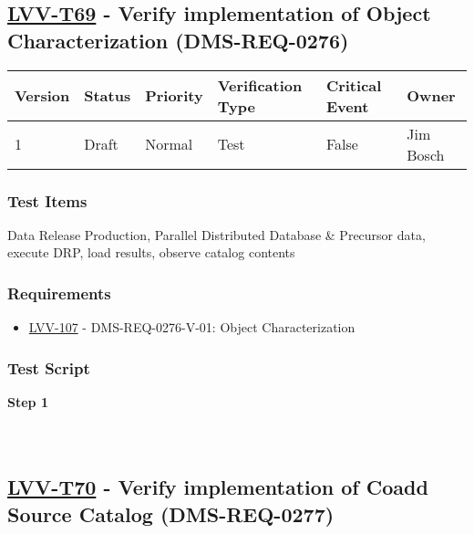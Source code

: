 \hypertarget{lvv-t69---verify-implementation-of-object-characterization-dms-req-0276}{%
\subsection{\texorpdfstring{\href{https://jira.lsstcorp.org/secure/Tests.jspa\#/testCase/LVV-T69}{LVV-T69}
- Verify implementation of Object Characterization
(DMS-REQ-0276)}{LVV-T69 - Verify implementation of Object Characterization (DMS-REQ-0276)}}\label{lvv-t69---verify-implementation-of-object-characterization-dms-req-0276}}

\begin{longtable}[]{@{}llllll@{}}
\toprule
Version & Status & Priority & Verification Type & Critical Event &
Owner\tabularnewline
\midrule
\endhead
1 & Draft & Normal & Test & False & Jim Bosch\tabularnewline
\bottomrule
\end{longtable}

\hypertarget{test-items-45}{%
\subsubsection{Test Items}\label{test-items-45}}

Data Release Production, Parallel Distributed Database \& Precursor
data, execute DRP, load results, observe catalog contents

\hypertarget{requirements-46}{%
\subsubsection{Requirements}\label{requirements-46}}

\begin{itemize}
\tightlist
\item
  \href{https://jira.lsstcorp.org/browse/LVV-107}{LVV-107} -
  DMS-REQ-0276-V-01: Object Characterization
\end{itemize}

\hypertarget{test-script-46}{%
\subsubsection{Test Script}\label{test-script-46}}

\textbf{Step 1}\\
~\\
~\\

\hypertarget{lvv-t70---verify-implementation-of-coadd-source-catalog-dms-req-0277}{%
\subsection{\texorpdfstring{\href{https://jira.lsstcorp.org/secure/Tests.jspa\#/testCase/LVV-T70}{LVV-T70}
- Verify implementation of Coadd Source Catalog
(DMS-REQ-0277)}{LVV-T70 - Verify implementation of Coadd Source Catalog (DMS-REQ-0277)}}\label{lvv-t70---verify-implementation-of-coadd-source-catalog-dms-req-0277}}

